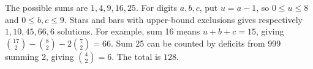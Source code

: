 The possible sums are $1,4,9,16,25$. For digits $a,b,c$, put $u=a-1$, so $0\le u\le8$ and $0\le b,c\le9$. Stars and bars with upper-bound exclusions gives respectively $1,10,45,66,6$ solutions. For example, sum 16 means $u+b+c=15$, giving $\binom{17}2-\binom82-2\binom72=66$. Sum 25 can be counted by deficits from 999 summing 2, giving $\binom42=6$. The total is $\boxed{128}$.
